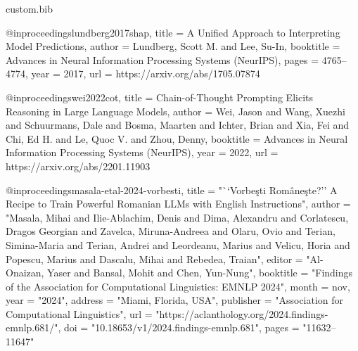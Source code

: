 \begin{filecontents*}[overwrite]{custom.bib}

@inproceedings{lundberg2017shap,
  title        = {A Unified Approach to Interpreting Model Predictions},
  author       = {Lundberg, Scott M. and Lee, Su-In},
  booktitle    = {Advances in Neural Information Processing Systems (NeurIPS)},
  pages        = {4765--4774},
  year         = {2017},
  url          = {https://arxiv.org/abs/1705.07874}
}

@inproceedings{wei2022cot,
  title        = {Chain-of-Thought Prompting Elicits Reasoning in Large Language Models},
  author       = {Wei, Jason and Wang, Xuezhi and Schuurmans, Dale and Bosma, Maarten and Ichter, Brian and Xia, Fei and Chi, Ed H. and Le, Quoc V. and Zhou, Denny},
  booktitle    = {Advances in Neural Information Processing Systems (NeurIPS)},
  year         = {2022},
  url          = {https://arxiv.org/abs/2201.11903}
}

@inproceedings{masala-etal-2024-vorbesti,
    title = "``Vorbe{\c s}ti Rom{\^a}ne{\c s}te?'' A Recipe to Train Powerful {R}omanian {LLM}s with {E}nglish Instructions",
    author = "Masala, Mihai  and
      Ilie-Ablachim, Denis  and
      Dima, Alexandru  and
      Corlatescu, Dragos Georgian  and
      Zavelca, Miruna-Andreea  and
      Olaru, Ovio  and
      Terian, Simina-Maria  and
      Terian, Andrei  and
      Leordeanu, Marius  and
      Velicu, Horia  and
      Popescu, Marius  and
      Dascalu, Mihai  and
      Rebedea, Traian",
    editor = "Al-Onaizan, Yaser  and
      Bansal, Mohit  and
      Chen, Yun-Nung",
    booktitle = "Findings of the Association for Computational Linguistics: EMNLP 2024",
    month = nov,
    year = "2024",
    address = "Miami, Florida, USA",
    publisher = "Association for Computational Linguistics",
    url = "https://aclanthology.org/2024.findings-emnlp.681/",
    doi = "10.18653/v1/2024.findings-emnlp.681",
    pages = "11632--11647"
}
\end{filecontents*}

\documentclass[11pt]{article}

\usepackage[review]{acl}

\usepackage{times}
\usepackage{latexsym}

